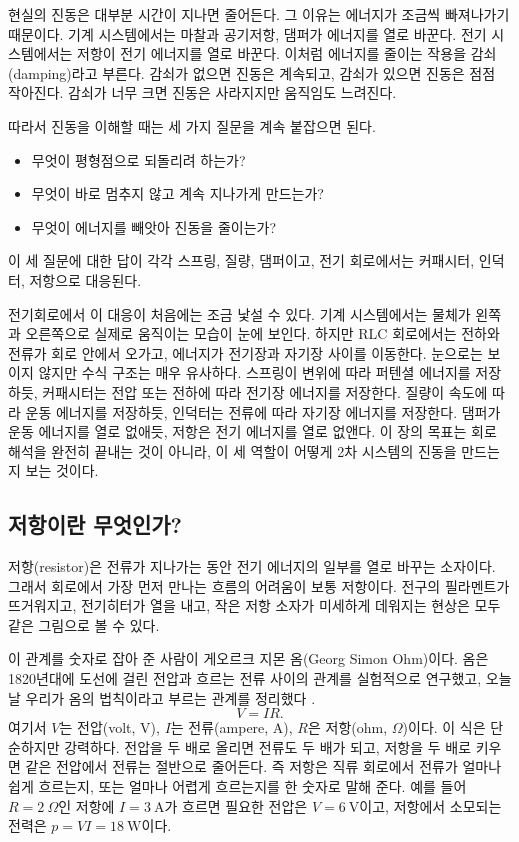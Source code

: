 현실의 진동은 대부분 시간이 지나면 줄어든다.
그 이유는 에너지가 조금씩 빠져나가기 때문이다.
기계 시스템에서는 마찰과 공기저항, 댐퍼가 에너지를 열로 바꾼다.
전기 시스템에서는 저항이 전기 에너지를 열로 바꾼다.
이처럼 에너지를 줄이는 작용을 감쇠(damping)라고 부른다.
감쇠가 없으면 진동은 계속되고, 감쇠가 있으면 진동은 점점 작아진다.
감쇠가 너무 크면 진동은 사라지지만 움직임도 느려진다.

따라서 진동을 이해할 때는 세 가지 질문을 계속 붙잡으면 된다.
\begin{itemize}
  \item 무엇이 평형점으로 되돌리려 하는가?
  \item 무엇이 바로 멈추지 않고 계속 지나가게 만드는가?
  \item 무엇이 에너지를 빼앗아 진동을 줄이는가?
\end{itemize}
이 세 질문에 대한 답이 각각 스프링, 질량, 댐퍼이고, 전기 회로에서는 커패시터, 인덕터, 저항으로 대응된다.

전기회로에서 이 대응이 처음에는 조금 낯설 수 있다.
기계 시스템에서는 물체가 왼쪽과 오른쪽으로 실제로 움직이는 모습이 눈에 보인다.
하지만 RLC 회로에서는 전하와 전류가 회로 안에서 오가고, 에너지가 전기장과 자기장 사이를 이동한다.
눈으로는 보이지 않지만 수식 구조는 매우 유사하다.
스프링이 변위에 따라 퍼텐셜 에너지를 저장하듯, 커패시터는 전압 또는 전하에 따라 전기장 에너지를 저장한다.
질량이 속도에 따라 운동 에너지를 저장하듯, 인덕터는 전류에 따라 자기장 에너지를 저장한다.
댐퍼가 운동 에너지를 열로 없애듯, 저항은 전기 에너지를 열로 없앤다.
이 장의 목표는 회로 해석을 완전히 끝내는 것이 아니라, 이 세 역할이 어떻게 2차 시스템의 진동을 만드는지 보는 것이다.

\subsection{저항이란 무엇인가?}

저항(resistor)은 전류가 지나가는 동안 전기 에너지의 일부를 열로 바꾸는 소자이다.
그래서 회로에서 가장 먼저 만나는 흐름의 어려움이 보통 저항이다.
전구의 필라멘트가 뜨거워지고, 전기히터가 열을 내고, 작은 저항 소자가 미세하게 데워지는 현상은 모두 같은 그림으로 볼 수 있다.

이 관계를 숫자로 잡아 준 사람이 게오르크 지몬 옴(Georg Simon Ohm)이다.
옴은 1820년대에 도선에 걸린 전압과 흐르는 전류 사이의 관계를 실험적으로 연구했고, 오늘날 우리가 옴의 법칙이라고 부르는 관계를 정리했다 \cite{ohm1827galvanischekette}.
\begin{equation}
  V=IR.
\end{equation}
여기서 $V$는 전압(volt, V), $I$는 전류(ampere, A), $R$은 저항(ohm, $\Omega$)이다.
이 식은 단순하지만 강력하다.
전압을 두 배로 올리면 전류도 두 배가 되고, 저항을 두 배로 키우면 같은 전압에서 전류는 절반으로 줄어든다.
즉 저항은 직류 회로에서 전류가 얼마나 쉽게 흐르는지, 또는 얼마나 어렵게 흐르는지를 한 숫자로 말해 준다.
예를 들어 $R=2~\Omega$인 저항에 $I=3~\mathrm{A}$가 흐르면 필요한 전압은 $V=6~\mathrm{V}$이고, 저항에서 소모되는 전력은 $p=VI=18~\mathrm{W}$이다.

